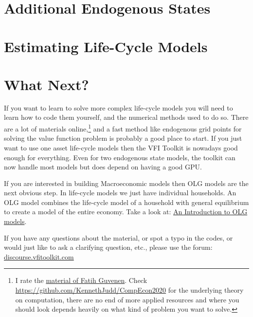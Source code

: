 \documentclass[11pt]{article}%
\begin{document}
\section{Additional Endogenous States} \label{sec:endostates}


\newpage
\section{Estimating Life-Cycle Models} \label{sec:estimation}




\newpage
\section{What Next?} \label{sec:whatnext}
If you want to learn to solve more complex life-cycle models you will need to learn how to code them yourself, and the numerical methods used to do so. There are a lot of materials online,\footnote{I rate the \href{https://www.fatihguvenen.com/phd-computational-methods}{material of Fatih Guvenen}. Check \href{Kenneth Judds lecture notes}{https://github.com/KennethJudd/CompEcon2020} for the underlying theory on computation, there are no end of more applied resources and where you should look depends heavily on what kind of problem you want to solve.} and a fast method like endogenous grid points for solving the value function problem is probably a good place to start. If you just want to use one asset life-cycle models then the VFI Toolkit is nowadays good enough for everything. Even for two endogenous state models, the toolkit can now handle most models but does depend on having a good GPU.

If you are interested in building Macroeconomic models then OLG models are the next obvious step. In life-cycle models we just have individual households. An OLG model combines the life-cycle model of a household with general equilibrium to create a model of the entire economy. Take a look at: \href{https://www.vfitoolkit.com/updates-blog/2022/an-introduction-to-olg-models/}{An Introduction to OLG models}.

If you have any questions about the material, or spot a typo in the codes, or would just like to ask a clarifying question, etc., please use the forum: \href{http://discourse.vfitoolkit.com/}{discourse.vfitoolkit.com}

\newpage



\end{document}
